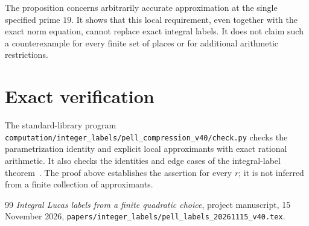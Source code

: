 \documentclass[11pt,a4paper]{article}
\theoremstyle{definition}\newtheorem{definition}[theorem]{Definition}
\theoremstyle{remark}\newtheorem{remark}[theorem]{Remark}
\begin{document}
The proposition concerns arbitrarily accurate approximation at the
single specified prime $19$. It shows that this local requirement,
even together with the exact norm equation, cannot replace exact
integral labels. It does not claim such a counterexample for every
finite set of places or for additional arithmetic restrictions.

\section{Exact verification}
The standard-library program
\nolinkurl{computation/integer_labels/pell_compression_v40/check.py}
checks the parametrization identity and explicit local approximants
with exact rational arithmetic. It also checks the identities and
edge cases of the integral-label theorem~\cite{IntegralLabels}.
The proof above establishes the assertion for every $r$; it is not
inferred from a finite collection of approximants.

\begin{thebibliography}{99}
\emph{Integral Lucas labels from a finite quadratic choice},
project manuscript, 15 November 2026,
\nolinkurl{papers/integer_labels/pell_labels_20261115_v40.tex}.
\end{thebibliography}
\end{document}
